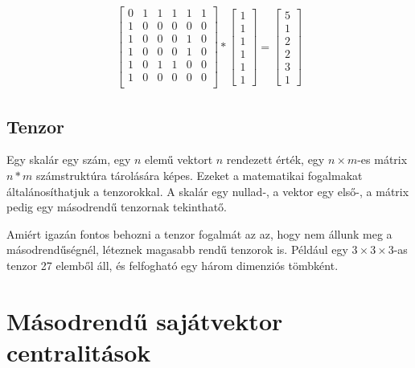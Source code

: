 \documentclass[12pt,numbers=noenddot]{report}
\begin{document}
\begin{align}
	\begin{bmatrix}
		0 & 1 & 1 & 1 & 1 & 1 \\
		1 & 0 & 0 & 0 & 0 & 0 \\
		1 & 0 & 0 & 0 & 1 & 0 \\
		1 & 0 & 0 & 0 & 1 & 0 \\
		1 & 0 & 1 & 1 & 0 & 0 \\
		1 & 0 & 0 & 0 & 0 & 0 \\
	\end{bmatrix}
	*
	\begin{bmatrix}
		1\\
		1\\
		1\\
		1\\
		1\\
		1
	\end{bmatrix}
	=
	\begin{bmatrix}
		5\\
		1\\
		2\\
		2\\
		3\\
		1
	\end{bmatrix}
\end{align}


\section{Tenzor}

Egy skalár egy szám, egy $n$ elemű vektort $n$ rendezett érték, egy 
$n \times m$-es mátrix $n*m$ számstruktúra tárolására képes. 
Ezeket a matematikai fogalmakat általánosíthatjuk a tenzorokkal. 
A skalár egy nullad-, a vektor egy első-, a mátrix pedig egy másodrendű tenzornak 
tekinthatő.

Amiért igazán fontos behozni a tenzor fogalmát az az, hogy nem állunk meg a 
másodrendűségnél, léteznek magasabb rendű tenzorok is. Például egy 
$3 \times 3 \times 3$-as tenzor 27 elemből áll, és felfogható egy három 
dimenziós tömbként.



\chapter{Másodrendű sajátvektor centralitások}
\end{document}
